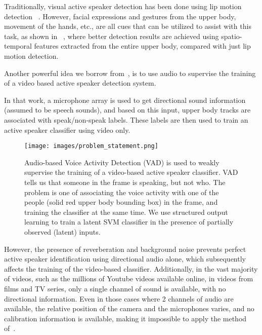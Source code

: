 \documentclass[runningheads]{llncs}
\begin{document}
Traditionally, visual active speaker detection has been done using lip motion detection ~\cite{elKhoury14,Everingham06,Everingham09,Haider12}. However, facial expressions and gestures from the upper body, movement of the hands, etc., are all cues that can be utilized to assist with this task,
as shown in ~\cite{Chakravarty15}, where better detection results are achieved using spatio-temporal features extracted from the entire upper body, compared with just lip motion detection.


Another powerful idea we borrow from~\cite{Chakravarty15}, is to use audio to supervise the training of a video based active speaker detection system.

In that work, a microphone array is used to get directional sound information (assumed to be speech sounds), and based on this input, upper body tracks are associated with speak/non-speak labels. These labels are then used to train an active speaker classifier using video only.

\begin{wrapfigure}[21]{r}{0.5\textwidth}
\centering
\vspace*{-1.1cm} 
    \texttt{[image: images/problem\_statement.png]} 
   \caption{Audio-based Voice Activity Detection (VAD) is used to weakly supervise the training of a video-based active speaker classifier. VAD tells us that someone in the frame is speaking, but not who. The problem is one of associating the voice activity with one of the people (solid red upper body bounding box) in the frame, and training the classifier at the same time. We use structured output learning to train a latent SVM classifier in the presence of partially observed (latent) inputs.}
\label{fig:problemStatement}
\end{wrapfigure}

However, the presence of reverberation and background noise prevents perfect active speaker identification using directional audio alone, which subsequently affects the training of the video-based classifier.
Additionally, in the vast majority of videos, such as the millions of Youtube videos available online, in videos from films and TV series, only a single channel of sound is available, with no directional information. Even in those cases where 2 channels of audio are available,  the relative position of the camera and the microphones varies, and no calibration information is available, making it impossible to apply the method of~\cite{Chakravarty15}.
\end{document}
